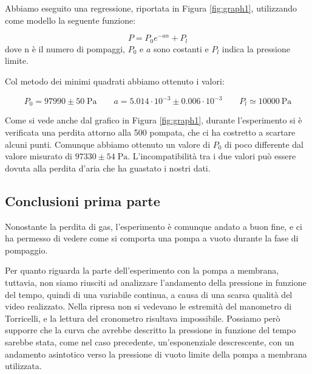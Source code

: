 Abbiamo eseguito una regressione, riportata in Figura \ref{fig:graph1}, utilizzando come modello la seguente funzione:

\begin{equation}
    P = P_0 e^{-an} + P_l
\end{equation}
%
dove n è il numero di pompaggi, $P_0$ e $a$ sono costanti e $P_l$ indica la pressione limite.

Col metodo dei minimi quadrati abbiamo ottenuto i valori:

\begin{equation}
    P_0 = 97990 \pm 50 \; \si{\pascal} \qquad a = 5.014 \cdot 10^{-3} \pm 0.006 \cdot 10^{-3} \qquad P_l \simeq \SI{10000}{\pascal}
\end{equation}

Come si vede anche dal grafico in Figura \ref{fig:graph1},
durante l'esperimento si è verificata una perdita attorno alla 500 pompata, che ci ha costretto a scartare alcuni punti.
Comunque abbiamo ottenuto un valore di $P_0$ di poco differente dal valore misurato di $97330 \pm 54 \; \si{\pascal}$.
L'incompatibilità tra i due valori può essere dovuta alla perdita d'aria che ha guastato i nostri dati.



\subsection{Conclusioni prima parte}

Nonostante la perdita di gas, l'esperimento è comunque andato a buon fine, e ci ha permesso di vedere come si comporta
una pompa a vuoto durante la fase di pompaggio.

Per quanto riguarda la parte dell'esperimento con la pompa a membrana, tuttavia, non siamo riusciti ad analizzare l'andamento della pressione in funzione del tempo, quindi di una variabile continua, a causa di una scarsa qualità del video realizzato. Nella ripresa non si vedevano le estremità del manometro di Torricelli, e la lettura del cronometro risultava impossibile. Possiamo però supporre che la curva che avrebbe descritto la pressione in funzione del tempo sarebbe stata, come nel caso precedente, un'esponenziale descrescente, con un andamento asintotico verso la pressione di vuoto limite della pompa a membrana utilizzata.
